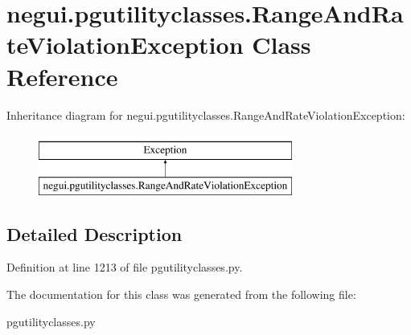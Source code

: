 \hypertarget{classnegui_1_1pgutilityclasses_1_1RangeAndRateViolationException}{}\section{negui.\+pgutilityclasses.\+Range\+And\+Rate\+Violation\+Exception Class Reference}
\label{classnegui_1_1pgutilityclasses_1_1RangeAndRateViolationException}
Inheritance diagram for negui.\+pgutilityclasses.\+Range\+And\+Rate\+Violation\+Exception\+:\begin{figure}[H]
\begin{center}
\leavevmode
\includegraphics[height=2.000000cm]{classnegui_1_1pgutilityclasses_1_1RangeAndRateViolationException}
\end{center}
\end{figure}


\subsection{Detailed Description}


Definition at line 1213 of file pgutilityclasses.\+py.



The documentation for this class was generated from the following file\+:\begin{DoxyCompactItemize}
\item 
pgutilityclasses.\+py\end{DoxyCompactItemize}
